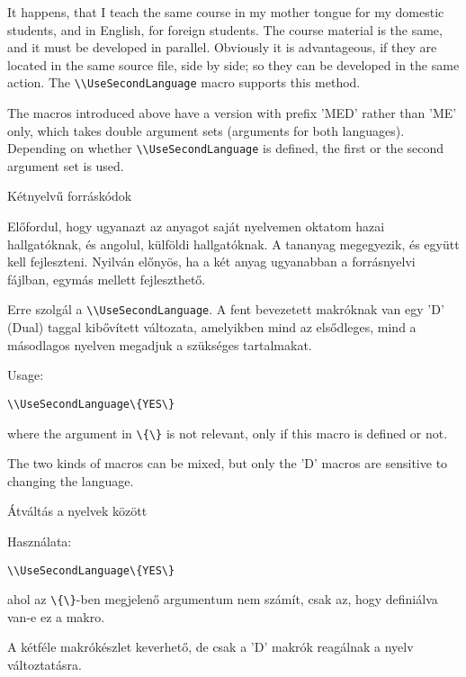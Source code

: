 
{
It happens, that I teach the same course in my mother tongue for my domestic students,
and in English, for foreign students.
The course material is the same, and it must be developed in parallel.
Obviously it is advantageous, if they are located in the same source file, side by side;
so they can be developed in the same action.
The \lstinline|\\UseSecondLanguage| macro supports this method.

The macros introduced above have a version with prefix 'MED' rather than 'ME' only,
which takes double argument sets (arguments for both languages). Depending on whether \lstinline|\\UseSecondLanguage| is defined,
the first or the second argument set is used.
}
{Kétnyelvű forráskódok}
{
Előfordul, hogy ugyanazt az anyagot saját nyelvemen oktatom hazai hallgatóknak,
és angolul, külföldi hallgatóknak. A tananyag megegyezik, és együtt kell fejleszteni.
Nyilván előnyös, ha a két anyag ugyanabban a forrásnyelvi fájlban, egymás mellett fejleszthető.

Erre szolgál a \lstinline|\\UseSecondLanguage|. A fent bevezetett makróknak van egy 'D' (Dual) taggal
kibővített változata, amelyikben mind az elsődleges, mind a másodlagos nyelven 
megadjuk a szükséges tartalmakat.
}

{

Usage:

\noindent\lstinline|\\UseSecondLanguage\{YES\}|

\noindent where the argument in \lstinline|\{\}| is not relevant, only if this macro is defined or not.

The two kinds of macros can be mixed, but only the 'D' macros 
are sensitive to changing the language.
}
{Átváltás a nyelvek között}
{

Használata:

\noindent\lstinline|\\UseSecondLanguage\{YES\}|

\noindent ahol az \lstinline|\{\}|-ben megjelenő argumentum nem számít, csak az, hogy definiálva van-e ez a makro.

A kétféle makrókészlet keverhető, de csak a 'D' makrók reagálnak 
a nyelv változtatásra.
}

